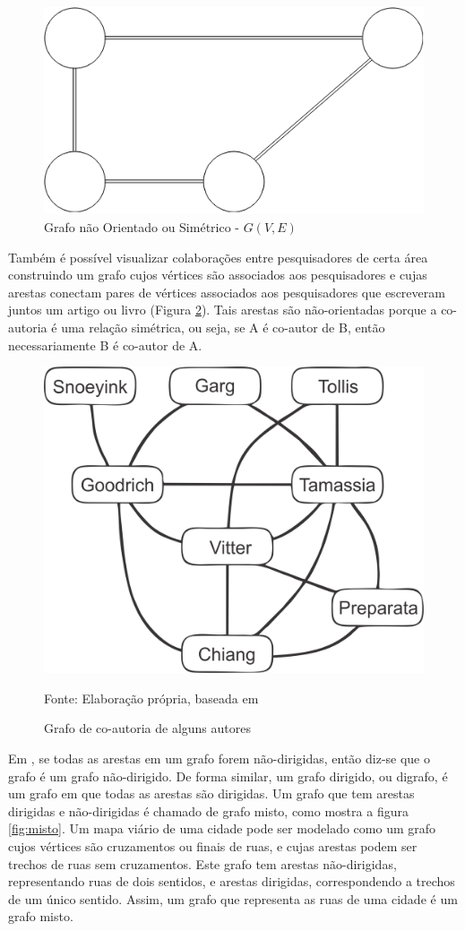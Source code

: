 \begin{figure}[htbp]
\centering
 \includegraphics[width=.35\textwidth]{chapters/fig/simetrico1.png}
\caption{Grafo não Orientado ou Simétrico - $G(V,E)$}
\label{fig:simetrico}
\end{figure}
\FloatBarrier

Também é possível visualizar colaborações entre pesquisadores de certa área construindo um grafo cujos vértices são
associados aos pesquisadores e cujas arestas conectam pares de vértices associados aos pesquisadores
que escreveram juntos um artigo ou livro (Figura \ref{fig:goodrich}). Tais arestas são não-orientadas porque
a co-autoria é uma relação simétrica, ou seja, se A é co-autor de B, então necessariamente B é co-autor de A.

\begin{figure}[htbp]
\centering
 \includegraphics[width=.35\textwidth]{chapters/fig/goodrich.png}
\caption{Grafo de co-autoria de alguns autores}
Fonte: Elaboração própria, baseada em \cite{goodrich}
\label{fig:goodrich}
\end{figure}
\FloatBarrier


Em \cite{goodrich}, se todas as arestas em um grafo forem não-dirigidas,
então diz-se que o grafo é um grafo não-dirigido. De forma similar, um grafo dirigido, ou digrafo, é um grafo em
que todas as arestas são dirigidas. Um grafo que tem arestas dirigidas e não-dirigidas é chamado de grafo misto, 
como mostra a figura \ref{fig:misto}.
Um mapa viário de uma cidade pode ser modelado como um grafo cujos vértices são cruzamentos ou finais de ruas, e cujas arestas
podem ser trechos de ruas sem cruzamentos. Este grafo tem arestas não-dirigidas, representando ruas de dois sentidos,
e arestas dirigidas, correspondendo a trechos de um único sentido. Assim, um grafo que representa as ruas de uma cidade
é um grafo misto.

